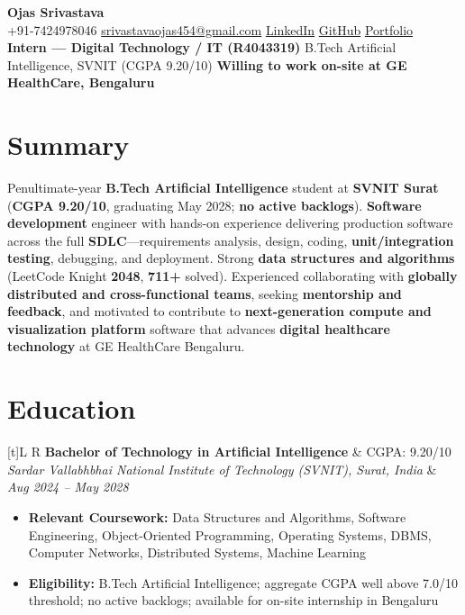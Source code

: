 \documentclass[a4paper,10pt]{article}
\newcommand{\resumeSubheading}[4]{%
  \vspace{0.5mm}
  \noindent
  \begin{tabularx}{\textwidth}[t]{L R}
    \textbf{#1} & #4 \\
    \textit{#3} & \textit{#2} \\
  \end{tabularx}
  \vspace{-0.5mm}%
}
\begin{document}
\selectfont

\begin{center}
  {\LARGE \textbf{Ojas Srivastava}} \\[1mm]
  \small
  +91-7424978046 \textbar{}
  \href{mailto:srivastavaojas454@gmail.com}{srivastavaojas454@gmail.com} \textbar{}
  \href{https://linkedin.com/in/ojas-srivastava05}{LinkedIn} \textbar{}
  \href{https://github.com/Ojas-Srivastava05}{GitHub} \textbar{}
  \href{https://ojas-srivastava.vercel.app}{Portfolio} \\[0.5mm]
  \textbf{Intern --- Digital Technology / IT (R4043319)} \textbar{}
  B.Tech Artificial Intelligence, SVNIT (CGPA 9.20/10) \textbar{}
  \textbf{Willing to work on-site at GE HealthCare, Bengaluru}
\end{center}

\vspace{-1mm}

\section{Summary}
\small
Penultimate-year \textbf{B.Tech Arti{f}icial Intelligence} student at \textbf{SVNIT Surat} (\textbf{CGPA 9.20/10}, graduating May 2028; \textbf{no active backlogs}). \textbf{Software development} engineer with hands-on experience delivering production software across the full \textbf{SDLC}---requirements analysis, design, coding, \textbf{unit/integration testing}, debugging, and deployment. Strong \textbf{data structures and algorithms} (LeetCode Knight \textbf{2048}, \textbf{711+} solved). Experienced collaborating with \textbf{globally distributed and cross-functional teams}, seeking \textbf{mentorship and feedback}, and motivated to contribute to \textbf{next-generation compute and visualization platform} software that advances \textbf{digital healthcare technology} at GE HealthCare Bengaluru.

\section{Education}
\small
\resumeSubheading
  {Bachelor of Technology in Arti{f}icial Intelligence}{Aug 2024 -- May 2028}
  {Sardar Vallabhbhai National Institute of Technology (SVNIT), Surat, India}{CGPA: 9.20/10}
\begin{itemize}
  \item \textbf{Relevant Coursework:} Data Structures and Algorithms, Software Engineering, Object-Oriented Programming, Operating Systems, DBMS, Computer Networks, Distributed Systems, Machine Learning
  \item \textbf{Eligibility:} B.Tech Artificial Intelligence; aggregate CGPA well above 7.0/10 threshold; no active backlogs; available for on-site internship in Bengaluru
\end{itemize}
\end{document}
